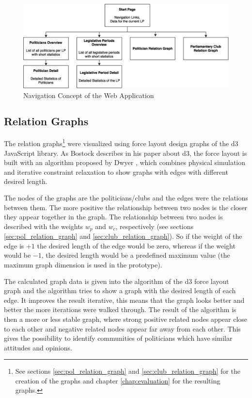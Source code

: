 \begin{figure}
	\centering
	\includegraphics[width=\textwidth]{imgs/navigation_concept}
	\caption{Navigation Concept of the Web Application}
	\label{fig:navigation_concept}
\end{figure}

\subsection{Relation Graphs}
The relation graphs\footnote{See sections \ref{sec:pol_relation_graph} and \ref{sec:club_relation_graph} for the creation of the graphs and chapter \ref{chap:evaluation} for the resulting graphs.} were visualized using force layout design graphs of the d3 JavaScript library. As Bostock \cite{d3_2011} describes in his paper about d3, the force layout is built with an algorithm proposed by Dwyer \cite{Dwyer_2009}, which combines physical simulation and iterative constraint relaxation to show graphs with edges with different desired length. 

The nodes of the graphs are the politicians/clubs and the edges were the relations between them. The more positive the relationship between two nodes is the closer they appear together in the graph. The relationship between two nodes is described with the weights $w_p$ and $w_c$, respectively (see sections \ref{sec:pol_relation_graph} and \ref{sec:club_relation_graph}). So if the weight of the edge is $+1$ the desired length of the edge would be zero, whereas if the weight would be $-1$, the desired length would be a predefined maximum value (the maximum graph dimension is used in the prototype).

The calculated graph data is given into the algorithm of the d3 force layout graph and the algorithm tries to show a graph with the desired length of each edge. It improves the result iterative, this means that the graph looks better and better the more iterations were walked through. The result of the algorithm is then a more or less stable graph, where strong positive related nodes appear close to each other and negative related nodes appear far away from each other. This gives the possibility to identify communities of politicians which have similar attitudes and opinions.

